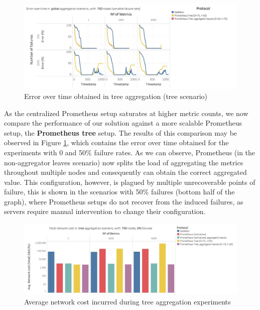 \begin{figure}
    \centering
    \includegraphics[width=\linewidth]{Chapters/evaluation/figures/aggregation/Error_over_time_global_tree.jpg}
    \caption{Error over time obtained in tree aggregation (tree scenario)}
    \label{fig:sec:mon_eval_tree_tree}
\end{figure}

As the centralized Prometheus setup saturates at higher metric counts, we now compare the performance of our solution against a more scalable Prometheus setup, the \textbf{Prometheus tree} setup. The results of this comparison may be observed in Figure \ref{fig:sec:mon_eval_tree_tree}, which contains the error over time obtained for the experiments with 0 and 50\% failure rates. As we can observe, Prometheus (in the non-aggregator leaves scenario) now splits the load of aggregating the metrics throughout multiple nodes and consequently can obtain the correct aggregated value. This configuration, however, is plagued by multiple unrecoverable points of failure, this is shown in the scenarios with 50\% failures (bottom half of the graph), where Prometheus setups do not recover from the induced failures, as servers require manual intervention to change their configuration.

\begin{figure}
    \centering
    \includegraphics[width=\linewidth]{Chapters/evaluation/figures/aggregation/network_cost_tree.jpg}
    \caption{Average network cost incurred during tree aggregation experiments}
    \label{fig:sec:mon_eval_tree_net_cost}
\end{figure}

